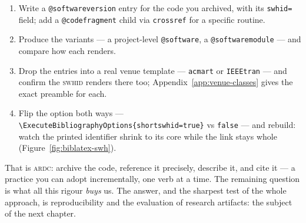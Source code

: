 \begin{handson}
\begin{enumerate}[nosep,leftmargin=*]
  \item Write a \texttt{@softwareversion} entry for the code you archived, with its \texttt{swhid=}
        field; add a \texttt{@codefragment} child via \texttt{crossref} for a specific routine.
  \item Produce the variants --- a project-level \texttt{@software}, a \texttt{@softwaremodule} ---
        and compare how each renders.
  \item Drop the entries into a real venue template --- \texttt{acmart} or \texttt{IEEEtran} --- and
        confirm the \textsc{swhid} renders there too; Appendix~\ref{app:venue-classes} gives the
        exact preamble for each.
  \item Flip the option both ways --- \texttt{\textbackslash ExecuteBibliographyOptions\{shortswhid=true\}}
        vs \texttt{false} --- and rebuild: watch the printed identifier shrink to its core while the
        link stays whole (Figure~\ref{fig:biblatex-swh}).
\end{enumerate}
\end{handson}

That is \textsc{ardc}: archive the code, reference it precisely, describe it, and cite it --- a
practice you can adopt incrementally, one verb at a time. The remaining question is what all this
rigour \emph{buys} us. The answer, and the sharpest
test of the whole approach, is reproducibility and the evaluation of research artifacts: the
subject of the next chapter.
